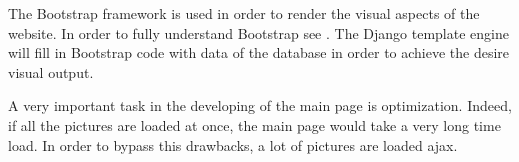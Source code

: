 The Bootstrap framework is used in order to render the visual aspects of the website. In order to fully understand Bootstrap see \cite{Bootstrap, Bootstrap_doc}. The Django template engine will fill in Bootstrap code with data of the database in order to achieve the desire visual output. 


A very important task in the developing of the main page is optimization. Indeed, if all the pictures are loaded at once, the main page would take a very long time load. In order to bypass this drawbacks, a lot of pictures are loaded ajax.  


